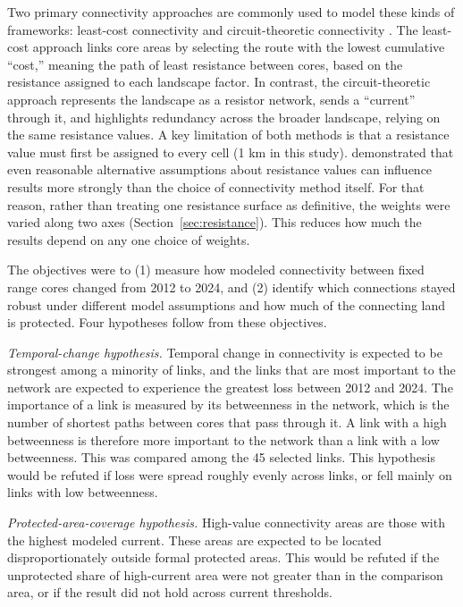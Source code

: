 Two primary connectivity approaches are commonly used to model these kinds of frameworks: least-cost connectivity and circuit-theoretic connectivity \parencite{adriaensen2003leastcost,mcrae2008circuit}. The least-cost approach links core areas by selecting the route with the lowest cumulative ``cost,'' meaning the path of least resistance between cores, based on the resistance assigned to each landscape factor. In contrast, the circuit-theoretic approach represents the landscape as a resistor network, sends a ``current'' through it, and highlights redundancy across the broader landscape, relying on the same resistance values. A key limitation of both methods is that a resistance value must first be assigned to every cell (1 km in this study). \textcite{zeller2012resistance} demonstrated that even reasonable alternative assumptions about resistance values can influence results more strongly than the choice of connectivity method itself. For that reason, rather than treating one resistance surface as definitive, the weights were varied along two axes (Section~\ref{sec:resistance}). This reduces how much the results depend on any one choice of weights.

The objectives were to (1) measure how modeled connectivity between fixed range cores changed from 2012 to 2024, and (2) identify which connections stayed robust under different model assumptions and how much of the connecting land is protected. Four hypotheses follow from these objectives.

\medskip
\noindent\textit{Temporal-change hypothesis.} Temporal change in connectivity is expected to be strongest among a minority of links, and the links that are most important to the network are expected to experience the greatest loss between 2012 and 2024. The importance of a link is measured by its betweenness in the network, which is the number of shortest paths between cores that pass through it. A link with a high betweenness is therefore more important to the network than a link with a low betweenness. This was compared among the 45 selected links. This hypothesis would be refuted if loss were spread roughly evenly across links, or fell mainly on links with low betweenness.

\medskip
\noindent\textit{Protected-area-coverage hypothesis.} High-value connectivity areas are those with the highest modeled current. These areas are expected to be located disproportionately outside formal protected areas. This would be refuted if the unprotected share of high-current area were not greater than in the comparison area, or if the result did not hold across current thresholds.

